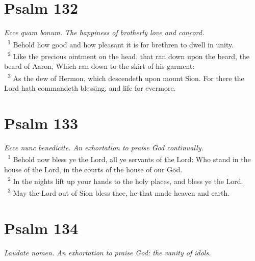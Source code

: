 \documentclass[a5paper,12pt]{article}
\begin{document}
\begin{multicols*}{2}
\section{Psalm 132}
\label{sec:org5a4a64d}
\emph{Ecce quam bonum. The happiness of brotherly love and concord.}\\

~\textsuperscript{1} Behold how good and how pleasant it is for brethren to dwell in unity.\\
~\textsuperscript{2} Like the precious ointment on the head, that ran down upon the beard, the beard of Aaron, Which ran down to the skirt of his garment:\\
~\textsuperscript{3} As the dew of Hermon, which descendeth upon mount Sion. For there the Lord hath commandeth blessing, and life for evermore.\\

\section{Psalm 133}
\label{sec:org07636f4}
\emph{Ecce nunc benedicite. An exhortation to praise God continually.}\\

~\textsuperscript{1} Behold now bless ye the Lord, all ye servants of the Lord: Who stand in the house of the Lord, in the courts of the house of our God.\\
~\textsuperscript{2} In the nights lift up your hands to the holy places, and bless ye the Lord.\\
~\textsuperscript{3} May the Lord out of Sion bless thee, he that made heaven and earth.\\

\section{Psalm 134}
\label{sec:orgd95206c}
\emph{Laudate nomen. An exhortation to praise God: the vanity of idols.}\\


\end{multicols*}
\end{document}
